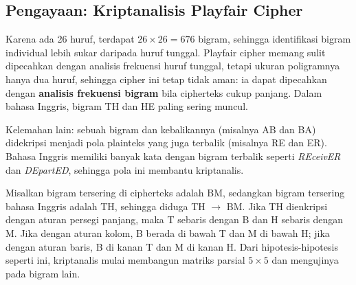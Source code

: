 \subsection{Pengayaan: Kriptanalisis Playfair Cipher}

Karena ada 26 huruf, terdapat $26 \times 26 = 676$ bigram, sehingga identifikasi bigram individual lebih sukar daripada huruf tunggal. Playfair cipher memang sulit dipecahkan dengan analisis frekuensi huruf tunggal, tetapi ukuran poligramnya hanya dua huruf, sehingga cipher ini tetap tidak aman: ia dapat dipecahkan dengan \textbf{analisis frekuensi bigram} bila cipherteks cukup panjang. Dalam bahasa Inggris, bigram TH dan HE paling sering muncul.

Kelemahan lain: sebuah bigram dan kebalikannya (misalnya AB dan BA) didekripsi menjadi pola plainteks yang juga terbalik (misalnya RE dan ER). Bahasa Inggris memiliki banyak kata dengan bigram terbalik seperti \textit{REceivER} dan \textit{DEpartED}, sehingga pola ini membantu kriptanalis.

\begin{contoh}
Misalkan bigram tersering di cipherteks adalah BM, sedangkan bigram tersering bahasa Inggris adalah TH, sehingga diduga TH $\rightarrow$ BM. Jika TH dienkripsi dengan aturan persegi panjang, maka T sebaris dengan B dan H sebaris dengan M. Jika dengan aturan kolom, B berada di bawah T dan M di bawah H; jika dengan aturan baris, B di kanan T dan M di kanan H. Dari hipotesis-hipotesis seperti ini, kriptanalis mulai membangun matriks parsial $5 \times 5$ dan mengujinya pada bigram lain.
\end{contoh}

